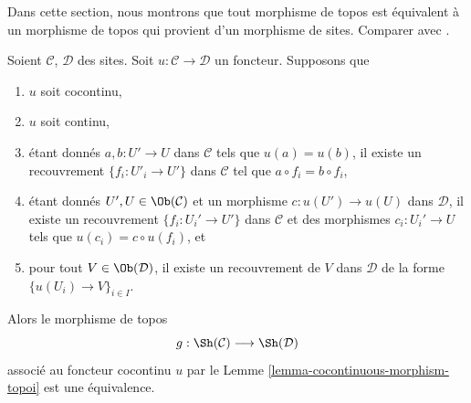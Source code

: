 \noindent
Dans cette section, nous montrons que tout morphisme de topos est équivalent
à un morphisme de topos qui provient d’un morphisme de sites.
Comparer avec \cite[Expos\'e III, Proposition 4.9.4]{SGA4}.

\begin{lemma}
\label{lemma-equivalence}
Soient $\mathcal{C}$, $\mathcal{D}$ des sites.
Soit $u : \mathcal{C} \to \mathcal{D}$ un foncteur.
Supposons que
\begin{enumerate}
\item $u$ soit cocontinu,
\item $u$ soit continu,
\item étant donnés $a, b : U' \to U$ dans $\mathcal{C}$ tels que
$u(a) = u(b)$, il existe un recouvrement $\{f_i : U'_i \to U'\}$
dans $\mathcal{C}$ tel que $a \circ f_i = b \circ f_i$,
\item étant donnés $U', U \in \Ob(\mathcal{C})$ et
un morphisme $c : u(U') \to u(U)$ dans $\mathcal{D}$, il existe
un recouvrement $\{f_i : U_i' \to U'\}$ dans $\mathcal{C}$
et des morphismes $c_i : U_i' \to U$ tels que $u(c_i) = c \circ u(f_i)$, et
\item pour tout $V \in \Ob(\mathcal{D})$, il existe un recouvrement
de $V$ dans $\mathcal{D}$ de la forme $\{u(U_i) \to V\}_{i \in I}$.
\end{enumerate}
Alors le morphisme de topos
$$
g : \Sh(\mathcal{C}) \longrightarrow \Sh(\mathcal{D})
$$
associé au foncteur cocontinu $u$ par le
Lemme \ref{lemma-cocontinuous-morphism-topoi}
est une équivalence.
\end{lemma}

